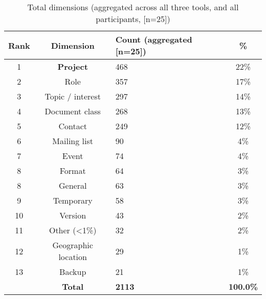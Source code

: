 \begin{table}[btp]
\begin{center}
\begin{footnotesize}
\setlength{\extrarowheight}{2pt}
\begin{tabular}{|c|c|p{4cm}|c|}
\hline
{\bf Rank} & {\bf Dimension} & {\bf Count (aggregated [n=25])} &   {\bf \%} \\
\hline
         1 & {\bf Project} &        468 &     22\% \\
\hline
         2 &       Role &        357 &     17\% \\
\hline
         3 & Topic / interest &        297 &     14\% \\
\hline
         4 & Document class &        268 &     13\% \\
\hline
         5 &    Contact &        249 &     12\% \\
\hline
         6 & Mailing list &         90 &      4\% \\
\hline
         7 &      Event &         74 &      4\% \\
\hline
         8 &     Format &         64 &      3\% \\
\hline
         8 &    General &         63 &      3\% \\
\hline
         9 &  Temporary &         58 &      3\% \\
\hline
        10 &   Version  &         43 &      2\% \\
\hline
        11 & Other (<1\%) &         32 &      2\% \\
\hline
        12 & Geographic location &         29 &      1\% \\
\hline
        13 &     Backup &         21 &      1\% \\
\hline
    {\bf } & {\bf Total} & {\bf 2113} & {\bf 100.0\%} \\
\hline
\end{tabular}  
\end{footnotesize}
\caption{Total dimensions (aggregated across all three tools, and all participants, [n=25])}
\label{table:exp-study:overall-org-dims}
\end{center}
\end{table}









